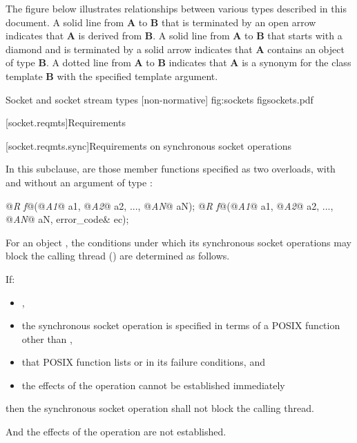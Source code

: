 \pnum
The figure below illustrates relationships between various types described in this document. A solid line from \textbf{A} to \textbf{B} that is terminated by an open arrow indicates that \textbf{A} is derived from \textbf{B}. A solid line from \textbf{A} to \textbf{B} that starts with a diamond and is terminated by a solid arrow indicates that \textbf{A} contains an object of type \textbf{B}. A dotted line from \textbf{A} to \textbf{B} indicates that \textbf{A} is a synonym for the class template \textbf{B} with the specified template argument.

\begin{importgraphic}
{Socket and socket stream types [non-normative]}
{fig:sockets}
{figsockets.pdf}
\end{importgraphic}



[socket.reqmts]{Requirements}


[socket.reqmts.sync]{Requirements on synchronous socket operations}

\pnum
In this subclause,  are those member functions specified as two overloads, with and without an argument of type :

\begin{codeblock}
@\textit{R f}@(@\textit{A1}@ a1, @\textit{A2}@ a2, ..., @\textit{AN}@ aN);
@\textit{R f}@(@\textit{A1}@ a1, @\textit{A2}@ a2, ..., @\textit{AN}@ aN, error_code& ec);
\end{codeblock}

\pnum
For an object , the conditions under which its synchronous socket operations may block the calling thread () are determined as follows.

\pnum
If:

\begin{itemize}
\item
{},
\item
the synchronous socket operation is specified in terms of a POSIX function other than ,
\item
that POSIX function lists  or  in its failure conditions, and
\item
the effects of the operation cannot be established immediately
\end{itemize}

then the synchronous socket operation shall not block the calling thread. \begin{note} And the effects of the operation are not established. \end{note}


